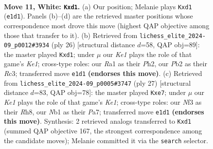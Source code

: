 \documentclass[11pt]{article}
\begin{document}
\clearpage

\begin{figure}[p]\centering
\begin{subfigure}{0.46\textwidth}\centering
\resizebox{\linewidth}{!}{%
\newchessgame
\chessboard[
  setfen={r1b1kb1r/1p2pppp/pnn5/4P3/8/5NP1/PP3P1P/RNBqKB1R w kq - 0 11},
  showmover=false,
  pgfstyle=straightmove, color=movearrow, markmove={e1-d1}
]}
\caption{}
\end{subfigure}\hfill
\begin{subfigure}{0.46\textwidth}\centering
\resizebox{\linewidth}{!}{%
\newchessgame
\chessboard[
  setfen={r1b1r1k1/pp3ppp/2n1pn2/6B1/1PP5/P1R2N2/5PPP/3qKB1R w K - 0 14},
  showmover=false,
  pgfstyle=straightmove, color=movearrow, markmove={e1-d1}
]}
\caption{}
\end{subfigure}
\\[4pt]
\begin{subfigure}{0.46\textwidth}\centering
\resizebox{\linewidth}{!}{%
\newchessgame
\chessboard[
  setfen={r3k2r/pb1nQppp/2n1p3/1pp5/4P3/2P2NP1/PP3PBP/R1B1R1K1 b kq - 0 14},
  showmover=false,
  pgfstyle=straightmove, color=movearrow, markmove={e8-e7}
]}
\caption{}
\end{subfigure}\hfill

\caption{\textbf{Move 11, White: \texttt{Kxd1}.} (a) Our position; Melanie plays \texttt{Kxd1} (\texttt{e1d1}). Panels (b)--(d) are the retrieved master positions whose correspondence most drove this move (highest QAP objective among those that transfer to it). (b) Retrieved from \texttt{lichess\_elite\_2024-09\_p0012\#3934} (ply 26) [structural distance $d$=58, QAP obj=89]: the master played \texttt{Kxd1}; under $\mu$ our \emph{Ke1} plays the role of that game's \emph{Ke1}; cross-type roles: our \emph{R}a1 as their \emph{P}h2, our \emph{P}b2 as their \emph{R}c3; transferred move \texttt{e1d1} \textbf{(endorses this move)}. (c) Retrieved from \texttt{lichess\_elite\_2024-09\_p0005\#3747} (ply 27) [structural distance $d$=83, QAP obj=78]: the master played \texttt{Kxe7}; under $\mu$ our \emph{Ke1} plays the role of that game's \emph{Ke1}; cross-type roles: our \emph{N}f3 as their \emph{R}h8, our \emph{N}b1 as their \emph{P}a7; transferred move \texttt{e1d1} \textbf{(endorses this move)}. Synthesis: 2 retrieved analogs transferred to \texttt{Kxd1} (summed QAP objective 167, the strongest correspondence among the candidate moves); Melanie committed it via the \texttt{search} selector.}
\label{fig:thought-m20}
\end{figure}
\end{document}

